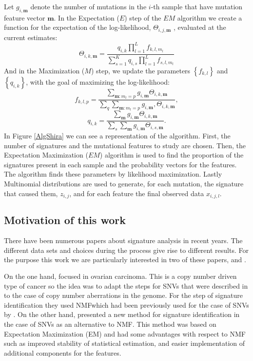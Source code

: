 \documentclass[a4paper]{article}
\begin{document}
Let $g_{i,\textbf{m}}$ denote the number of mutations in the $i$-th sample that have mutation feature vector $\textbf{m}$. In the Expectation ($E$) step of the $EM$ algorithm we create a function for the expectation of the log-likelihood, $\Theta_{i,j,\textbf{m}}$ , evaluated at the current estimates:
\begin{equation*}
\Theta_{i,k,\textbf{m}}=\frac{q_{i,k}\prod_{l=1}^{L}f_{k,l,m_l}}{\sum_{s=1}^{K}q_{i,s}\prod_{l=1}^{L}f_{s,l,m_l}}
\end{equation*}
And in the Maximization ($M$) step, we update the parameters $\left\{f_{k,l}\right\}$ and $\left\{q_{i,k}\right\}$, with the goal of maximizing the log-likelihood:
\begin{equation*}
f_{k,l,p}=\frac{\sum_{\textbf{m}:m_l=p}g_{i,\textbf{m}}\Theta_{i,k,\textbf{m}}}{\sum_{q}\sum_{\textbf{m}:m_l=p}g_{i,\textbf{m}},\Theta_{i,k,\textbf{m}}},
\end{equation*}
\begin{equation*}
q_{i,k}=\frac{\sum_{\textbf{m}}g_{i,\textbf{m}}\Theta_{i,k,\textbf{m}}}{\sum_{s}\sum_{\textbf{m}}g_{i,\textbf{m}}\Theta_{i,s,\textbf{m}}}.
\end{equation*}
In Figure \ref{AlgShira} we can see a representation of the algorithm. First, the number of signatures and the mutational features to study are chosen. Then, the Expectation Maximization ($EM$) algorithm is used to find the proportion of  the signatures present in each sample and the probability vectors for the features. The algorithm finds these parameters by likelihood maximization. Lastly Multinomial distributions are used to generate, for each mutation, the signature that caused them, $z_{i,j}$, and for each feature the final observed data $x_{i,j,l}$.

\subsection{Motivation of this work}
There have been numerous papers about signature analysis in recent years. The different data sets and choices during the process give rise to different results. For the purpose this work we are particularly interested in two of these papers, \cite{Geoff} and \cite{Shira}. 

On the one hand, \cite{Geoff} focused in ovarian carcinoma. This is a copy number driven type of cancer so the idea was to adapt the steps for SNVs that were described in \cite{Alex} to the case of copy number aberrations in the genome. For the step of signature identification they used NMFwhich had been previously used for the case of SNVs by \cite{Alex}. On the other hand, \cite{Shira} presented a new method for signature identification in the case of SNVs as an alternative to NMF. This method was based on Expectation Maximization (EM) and had some advantages with respect to NMF such as improved stability of statistical estimation, and easier implementation of additional components for the features. 
\end{document}
